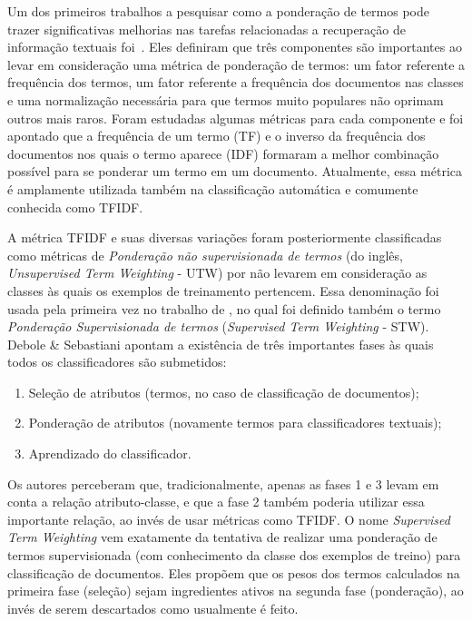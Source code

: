 Um dos primeiros trabalhos a pesquisar como a ponderação de termos pode trazer significativas melhorias nas tarefas relacionadas a recuperação de informação textuais foi~\cite{Salton88}.
Eles definiram que três componentes são importantes ao levar em consideração uma métrica de ponderação de termos: um fator referente a frequência dos termos, um fator referente a frequência dos documentos nas classes e uma normalização necessária para que termos muito populares não oprimam outros mais raros.
Foram estudadas algumas métricas para cada componente e foi apontado que a frequência de um termo (\textsc{TF}) e o inverso da frequência dos documentos nos quais o termo aparece (\textsc{IDF}) formaram a melhor combinação possível para se ponderar um termo em um documento.
Atualmente, essa métrica é amplamente utilizada também na classificação automática e comumente conhecida como \textsc{TFIDF}.

A métrica \textsc{TFIDF} e suas diversas variações foram posteriormente classificadas como métricas de \textit{Ponderação não supervisionada de termos} (do inglês, \textit{Unsupervised Term Weighting} - \textsc{UTW}) por não levarem em consideração as classes às quais os exemplos de treinamento pertencem. Essa denominação foi usada pela primeira vez no trabalho de \cite{Debole03}, no qual foi definido também o termo \textit{Ponderação Supervisionada de termos} (\textit{Supervised Term Weighting} - \textsc{STW}).
Debole \& Sebastiani apontam a existência de três importantes fases às quais todos os classificadores são submetidos:
\begin{enumerate}
\item Seleção de atributos (termos, no caso de classificação de documentos);
\item Ponderação de atributos (novamente termos para classificadores textuais);
\item Aprendizado do classificador.
\end{enumerate}
Os autores perceberam que, tradicionalmente, apenas as fases 1 e 3 levam em conta a relação atributo-classe, e que a fase 2 também poderia utilizar essa importante relação, ao invés de usar métricas como \textsc{TFIDF}.
O nome \textit{Supervised Term Weighting} vem exatamente da tentativa de realizar uma ponderação de termos supervisionada (com conhecimento da classe dos exemplos de treino) para classificação de documentos. Eles propõem que os pesos dos termos calculados na primeira fase (seleção) sejam ingredientes ativos na segunda fase (ponderação), ao invés de serem descartados como usualmente é feito.

